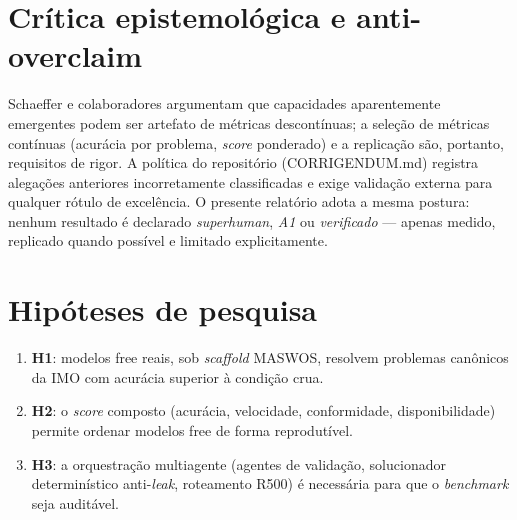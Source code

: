 \section{Crítica epistemológica e anti-overclaim}

Schaeffer e colaboradores \cite{schaeffer_mirage} argumentam que capacidades
aparentemente emergentes podem ser artefato de métricas descontínuas; a
seleção de métricas contínuas (acurácia por problema, \textit{score}
ponderado) e a replicação são, portanto, requisitos de rigor. A política do
repositório (CORRIGENDUM.md) registra alegações anteriores incorretamente
classificadas e exige validação externa para qualquer rótulo de excelência. O
presente relatório adota a mesma postura: nenhum resultado é declarado
\textit{superhuman}, \textit{A1} ou \textit{verificado} — apenas medido,
replicado quando possível e limitado explicitamente.

\section{Hipóteses de pesquisa}

\begin{enumerate}
  \item \textbf{H1}: modelos free reais, sob \textit{scaffold} MASWOS,
  resolvem problemas canônicos da IMO com acurácia superior à condição crua.
  \item \textbf{H2}: o \textit{score} composto (acurácia, velocidade,
  conformidade, disponibilidade) permite ordenar modelos free de forma
  reprodutível.
  \item \textbf{H3}: a orquestração multiagente (agentes de validação,
  solucionador determinístico anti-\textit{leak}, roteamento R500) é
  necessária para que o \textit{benchmark} seja auditável.
\end{enumerate}